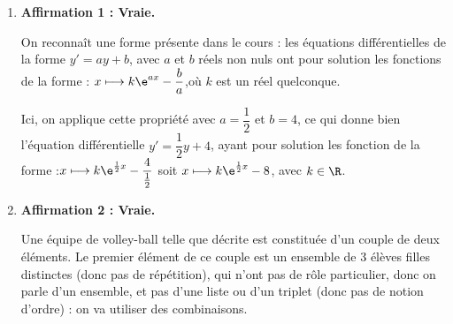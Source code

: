 
\medskip

\begin{enumerate}
	\item \textbf{Affirmation 1 : Vraie.}


	On reconnaît une forme présente dans le cours : les équations différentielles de la forme $y' = ay + b$, avec $a$ et $b$ réels non nuls ont pour solution les fonctions de la forme : \quad $x \longmapsto k\e^{ax} - \dfrac{b}{a}$,\quad où $k$ est un réel quelconque.

	Ici, on applique cette propriété avec $a = \dfrac{1}{2}$ et $b = 4$, ce qui donne bien l'équation différentielle $y' = \dfrac{1}{2}y + 4$, ayant pour solution les fonction de la forme :\quad$x \longmapsto k\e^{\frac{1}{2}x} - \dfrac{4}{\frac{1}{2}}$ soit $x \longmapsto k\e^{\frac{1}{2}x} - 8$, avec $k\in \R$.


	\item \textbf{Affirmation 2 : Vraie.}

	Une équipe de volley-ball telle que décrite est constituée d'un couple de deux éléments. Le premier élément de ce couple est un ensemble de 3 élèves filles distinctes (donc pas de répétition), qui n'ont pas de rôle particulier, donc on parle d'un ensemble, et pas d'une liste ou d'un triplet (donc pas de notion d'ordre) : on va utiliser des combinaisons.


\end{enumerate}
